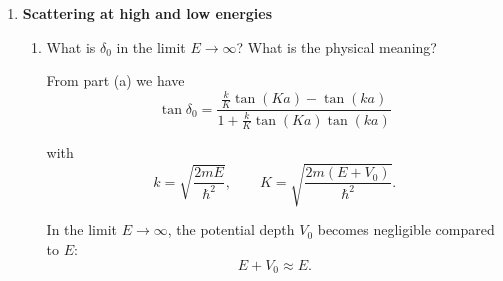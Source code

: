 \documentclass[11pt,a4paper]{scrartcl}
\begin{document}
\begin{enumerate}
\begin{calculationbox}
                Matching gives:
                \begin{calculationbox}
                    $K \cot(Ka) = k \cot(ka + \delta_0)$
                \end{calculationbox}

                Solve for $\tan\delta_0$:
                \begin{calculationbox}
                    $\tan(ka + \delta_0) = \frac{k}{K}\tan(Ka)$

                    Using
                    $\tan(ka + \delta_0)
                    =
                    \frac{\tan(ka) + \tan\delta_0}{1 - \tan(ka)\tan\delta_0}$

                    we obtain

                    $\tan\delta_0
                    =
                    \frac{\frac{k}{K}\tan(Ka) - \tan(ka)}
                    {1 + \frac{k}{K}\tan(Ka)\tan(ka)}$
                \end{calculationbox}

                with
                \begin{calculationbox}
                    $k = \sqrt{\frac{2mE}{\hbar^2}}, \quad
                    K = \sqrt{\frac{2m(E+V_0)}{\hbar^2}}$
                \end{calculationbox}

            \end{calculationbox}

        \item 
            \textbf{Scattering at high and low energies}
            \begin{enumerate}
                \item
                    What is $\delta_0$ in the limit $E \to \infty$? What is the physical meaning?

                    \begin{calculationbox}
                        From part (a) we have
                        \[
                        \tan\delta_0
                        =
                        \frac{\frac{k}{K}\tan(Ka)-\tan(ka)}
                        {1+\frac{k}{K}\tan(Ka)\tan(ka)}
                        \]

                        with
                        \[
                        k = \sqrt{\frac{2mE}{\hbar^2}},
                        \qquad
                        K = \sqrt{\frac{2m(E+V_0)}{\hbar^2}}.
                        \]

                        In the limit $E \to \infty$, the potential depth $V_0$ becomes negligible compared to $E$:
                        \[
                        E+V_0 \approx E.
                        \]


\end{calculationbox}
\end{enumerate}
\end{enumerate}
\end{document}
